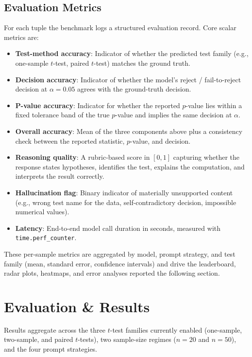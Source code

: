 \documentclass{article}
\begin{document}
\subsection{Evaluation Metrics}
\label{sec:evaluation-metrics}

For each tuple the benchmark logs a structured evaluation record. Core scalar metrics are:

\begin{itemize}
    \item \textbf{Test-method accuracy}: Indicator of whether the predicted test family (e.g., one-sample $t$-test, paired $t$-test) matches the ground truth.
    \item \textbf{Decision accuracy}: Indicator of whether the model’s reject / fail-to-reject decision at $\alpha=0.05$ agrees with the ground-truth decision.
    \item \textbf{P-value accuracy}: Indicator for whether the reported $p$-value lies within a fixed tolerance band of the true $p$-value and implies the same decision at $\alpha$.
    \item \textbf{Overall accuracy}: Mean of the three components above plus a consistency check between the reported statistic, $p$-value, and decision.
    \item \textbf{Reasoning quality}: A rubric-based score in $[0,1]$ capturing whether the response states hypotheses, identifies the test, explains the computation, and interprets the result correctly.
    \item \textbf{Hallucination flag}: Binary indicator of materially unsupported content (e.g., wrong test name for the data, self-contradictory decision, impossible numerical values).
    \item \textbf{Latency}: End-to-end model call duration in seconds, measured with \texttt{time.perf\_counter}.
\end{itemize}

These per-sample metrics are aggregated by model, prompt strategy, and test family (mean, standard error, confidence intervals) and drive the leaderboard, radar plots, heatmaps, and error analyses reported the following section.

\section{Evaluation \& Results}
\label{evaluation-result}
Results aggregate across the three $t$-test families currently enabled (one-sample, two-sample, and paired $t$-tests), two sample-size regimes ($n=20$ and $n=50$), and the four prompt strategies.
\end{document}
